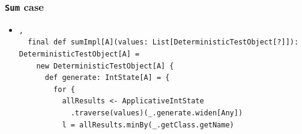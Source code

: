 \begin{frame}[fragile]
  \frametitle{ \lstinline|Sum| case}

  \begin{itemize}
    \item 
\begin{lstlisting}[style=scala],
  final def sumImpl[A](values: List[DeterministicTestObject[?]]): DeterministicTestObject[A] =
    new DeterministicTestObject[A] {
      def generate: IntState[A] = {
        for {
          allResults <- ApplicativeIntState
            .traverse(values)(_.generate.widen[Any])
          l = allResults.minBy(_.getClass.getName)
\end{lstlisting}
  \end{itemize}
\end{frame}







   
